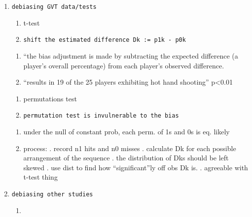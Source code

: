 \documentclass[12pt,twoside]{dukestatscithesis}
\providecommand{\tightlist}{%
  \setlength{\itemsep}{0pt}\setlength{\parskip}{0pt}}
\theoremstyle{definition}
\theoremstyle{definition}
\theoremstyle{definition}
\theoremstyle{remark}
\begin{document}
\begin{enumerate}
\def\labelenumi{\arabic{enumi}.}
\item
\begin{verbatim}
debiasing GVT data/tests
\end{verbatim}
  \begin{enumerate}
  \def\labelenumii{\alph{enumii}.}
  \item
    t-test
  \item
\begin{verbatim}
shift the estimated difference Dk := p1k - p0k
\end{verbatim}
  \end{enumerate}
  \begin{enumerate}
  \def\labelenumii{\roman{enumii}.}
  \setcounter{enumii}{1}
  \tightlist
  \item
    ``the bias adjustment is made by subtracting the expected difference
    (a player's overall percentage) from each player's observed
    difference.
  \item
    ``results in 19 of the 25 players exhibiting hot hand shooting''
    p\textless{}0.01
  \end{enumerate}
  \begin{enumerate}
  \def\labelenumii{\alph{enumii}.}
  \setcounter{enumii}{1}
  \item
    permutations test
  \item
\begin{verbatim}
permutation test is invulnerable to the bias
\end{verbatim}
  \end{enumerate}
  \begin{enumerate}
  \def\labelenumii{\roman{enumii}.}
  \setcounter{enumii}{1}
  \tightlist
  \item
    under the null of constant prob, each perm. of 1s and 0s is eq.
    likely
  \item
    process: . record n1 hits and n0 misses . calculate Dk for each
    possible arrangement of the sequence . the distribution of Dks
    should be left skewed . use dist to find how ``significant''ly off
    obs Dk is. . agreeable with t-test thing
  \end{enumerate}
\item
\begin{verbatim}
debiasing other studies
\end{verbatim}
  \begin{enumerate}
  \def\labelenumii{\alph{enumii}.}
  \item

\end{enumerate}
\end{enumerate}
\end{document}
